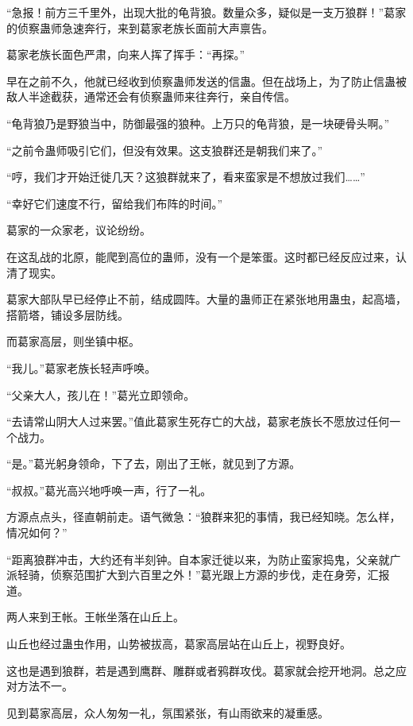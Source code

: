 
\begin{this_body}



“急报！前方三千里外，出现大批的龟背狼。数量众多，疑似是一支万狼群！”葛家的侦察蛊师急速奔行，来到葛家老族长面前大声禀告。

葛家老族长面色严肃，向来人挥了挥手：“再探。”

早在之前不久，他就已经收到侦察蛊师发送的信蛊。但在战场上，为了防止信蛊被敌人半途截获，通常还会有侦察蛊师来往奔行，亲自传信。

“龟背狼乃是野狼当中，防御最强的狼种。上万只的龟背狼，是一块硬骨头啊。”

“之前令蛊师吸引它们，但没有效果。这支狼群还是朝我们来了。”

“哼，我们才开始迁徙几天？这狼群就来了，看来蛮家是不想放过我们……”

“幸好它们速度不行，留给我们布阵的时间。”

葛家的一众家老，议论纷纷。

在这乱战的北原，能爬到高位的蛊师，没有一个是笨蛋。这时都已经反应过来，认清了现实。

葛家大部队早已经停止不前，结成圆阵。大量的蛊师正在紧张地用蛊虫，起高墙，搭箭塔，铺设多层防线。

而葛家高层，则坐镇中枢。

“我儿。”葛家老族长轻声呼唤。

“父亲大人，孩儿在！”葛光立即领命。

“去请常山阴大人过来罢。”值此葛家生死存亡的大战，葛家老族长不愿放过任何一个战力。

“是。”葛光躬身领命，下了去，刚出了王帐，就见到了方源。

“叔叔。”葛光高兴地呼唤一声，行了一礼。

方源点点头，径直朝前走。语气微急：“狼群来犯的事情，我已经知晓。怎么样，情况如何？”

“距离狼群冲击，大约还有半刻钟。自本家迁徙以来，为防止蛮家捣鬼，父亲就广派轻骑，侦察范围扩大到六百里之外！”葛光跟上方源的步伐，走在身旁，汇报道。

两人来到王帐。王帐坐落在山丘上。

山丘也经过蛊虫作用，山势被拔高，葛家高层站在山丘上，视野良好。

这也是遇到狼群，若是遇到鹰群、雕群或者鸦群攻伐。葛家就会挖开地洞。总之应对方法不一。

见到葛家高层，众人匆匆一礼，氛围紧张，有山雨欲来的凝重感。


\end{this_body}
